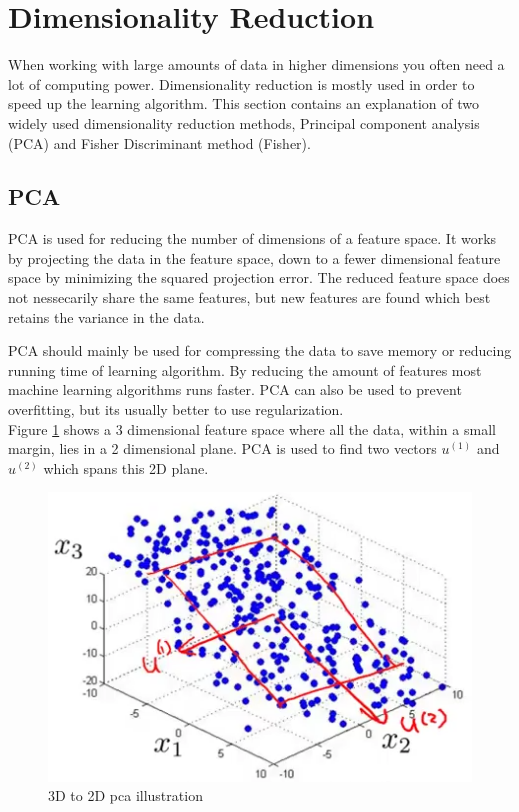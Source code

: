 
\section{Dimensionality Reduction}
When working with large amounts of data in higher dimensions you often need a lot of computing power. Dimensionality reduction is mostly used in order to speed up the learning algorithm. This section contains an explanation of two widely used dimensionality reduction methods, Principal component analysis (PCA) and Fisher Discriminant method (Fisher).


\subsection{PCA}

PCA is used for reducing the number of dimensions of a feature space.
It works by projecting the data in the feature space, down to a fewer dimensional feature space by minimizing the squared projection error.
The reduced feature space does not nessecarily share the same features, but new features are found which best retains the variance in the data.

PCA should mainly be used for compressing the data to save memory or reducing running time of learning algorithm.
By reducing the amount of features most machine learning algorithms runs faster.
PCA can also be used to prevent overfitting, but its usually better to use regularization. \\

Figure \ref{fig:pca} shows a 3 dimensional feature space where all the data, within a small margin, lies in a 2 dimensional plane.
PCA is used to find two vectors $u^{(1)}$ and $u^{(2)}$ which spans this 2D plane.

\begin{figure}[H]
\centering
\includegraphics{billeder/pca}
\caption{3D to 2D pca illustration}
\label{fig:pca}
\end{figure}

